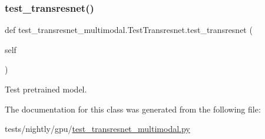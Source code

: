 \subsubsection{\texorpdfstring{test\+\_\+transresnet()}{test\_transresnet()}}
{\footnotesize\ttfamily def test\+\_\+transresnet\+\_\+multimodal.\+Test\+Transresnet.\+test\+\_\+transresnet (\begin{DoxyParamCaption}\item[{}]{self }\end{DoxyParamCaption})}

\begin{DoxyVerb}Test pretrained model.
\end{DoxyVerb}
 

The documentation for this class was generated from the following file\+:\begin{DoxyCompactItemize}
\item 
tests/nightly/gpu/\hyperlink{test__transresnet__multimodal_8py}{test\+\_\+transresnet\+\_\+multimodal.\+py}\end{DoxyCompactItemize}
